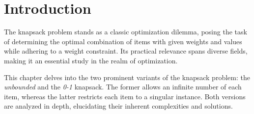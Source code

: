 \section{Introduction}
\label{sec:knapsack:intro}
  The knapsack problem stands as a classic optimization dilemma, posing the task 
  of determining the optimal combination of items with given weights and values 
  while adhering to a weight constraint.
  Its practical relevance spans diverse fields, making it an essential study in 
  the realm of optimization.

  This chapter delves into the two prominent variants of the knapsack problem: 
  the \emph{unbounded} and the \emph{0-1} knapsack.
  The former allows an infinite number of each item, whereas the latter 
  restricts each item to a singular instance.
  Both versions are analyzed in depth, elucidating their inherent complexities 
  and solutions.